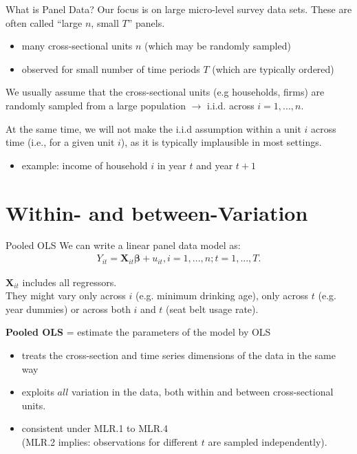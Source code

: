 \documentclass[11pt, aspectratio = 169]{beamer}
\begin{document}
\begin{frame}{What is Panel Data?}
Our focus is on large micro-level survey data sets. These are often called “large $n$, small $T$” panels.
\begin{itemize}
    \item many cross-sectional units $n$ (which may be randomly sampled) 
    \item observed for small number of time periods $T$ (which are typically ordered)
\end{itemize} 

\medskip 
We usually assume that the cross-sectional units (e.g households, firms) are randomly sampled from a large population $\rightarrow$ i.i.d. across $i = 1, ... , n$.

At the same time, we will not make the i.i.d assumption within a unit $i$ across time (i.e., for a given unit $i$), as it is typically implausible in most settings.
\vspace{-.3cm}
\small \begin{itemize}
    \item example: income of household $i$ in year $t$ and year $t+1$ 
\end{itemize} 

\end{frame}

\section{Within- and between-Variation}


\begin{frame}{Pooled OLS}
    We can write a linear panel data model  as:
\begin{align*}
   Y_{it} = \boldsymbol{X}_{it} \boldsymbol{\beta} + u_{it} , i = 1, ... , n; t = 1, ... , T. 
\end{align*}

$\boldsymbol{X}_{it}$ includes all regressors. \\
They might vary only across $i$ (e.g. minimum drinking age), only across $t$ (e.g. year dummies) or across both $i$ and $t$ (seat belt usage rate). 


\pause

\color{teal}\textbf{Pooled OLS} \color{black}
= estimate the parameters of the model by OLS

\begin{itemize}

\item  treats the cross-section and time series dimensions of the data in the
same way %

\item exploits $all$ variation in the data, both within and between cross-sectional units.

\item consistent under MLR.1 to MLR.4 \\
    (MLR.2 implies: observations for different $t$ are sampled independently).


\end{itemize} 
\end{frame}
\end{document}
